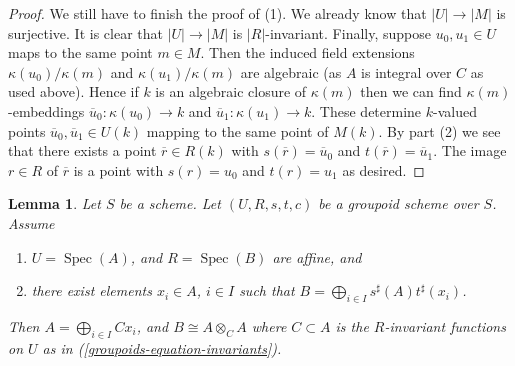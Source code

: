 \documentclass{amsart}
\theoremstyle{plain}
\newtheorem{lemma}[subsection]{Lemma}
\theoremstyle{definition}
\theoremstyle{remark}
\numberwithin{equation}{subsection}
\def\Spec{\mathop{\mathrm{Spec}}}
\begin{document}
\begin{proof}
\medskip\noindent
We still have to finish the proof of (1). We already know that
$|U| \to |M|$ is surjective. It is clear that $|U| \to |M|$ is
$|R|$-invariant. Finally, suppose $u_0, u_1 \in U$ maps to the same
point $m \in M$. Then the induced field extensions $\kappa(u_0)/\kappa(m)$
and $\kappa(u_1)/\kappa(m)$ are algebraic (as $A$ is integral over $C$
as used above). Hence if $k$ is an algebraic closure of $\kappa(m)$
then we can find $\kappa(m)$-embeddings $\overline{u}_0 : \kappa(u_0) \to k$
and $\overline{u}_1 : \kappa(u_1) \to k$. These determine $k$-valued
points $\overline{u}_0, \overline{u}_1 \in U(k)$ mapping to the same
point of $M(k)$. By part (2) we see that there exists a point
$\overline{r} \in R(k)$ with $s(\overline{r}) = \overline{u}_0$ and
$t(\overline{r}) = \overline{u}_1$. The image $r \in R$ of $\overline{r}$
is a point with $s(r) = u_0$ and $t(r) = u_1$ as desired.
\end{proof}


\begin{lemma}
\label{groupoids-lemma-basis}
Let $S$ be a scheme.
Let $(U, R, s, t, c)$ be a groupoid scheme over $S$.
Assume
\begin{enumerate}
\item $U = \Spec(A)$, and $R = \Spec(B)$ are affine, and
\item there exist elements $x_i \in A$, $i \in I$ such that
$B = \bigoplus_{i \in I} s^\sharp(A)t^\sharp(x_i)$.
\end{enumerate}
Then $A = \bigoplus_{i\in I} Cx_i$, and $B \cong A \otimes_C A$
where $C \subset A$ is the $R$-invariant
functions on $U$ as in (\ref{groupoids-equation-invariants}).
\end{lemma}
\end{document}
